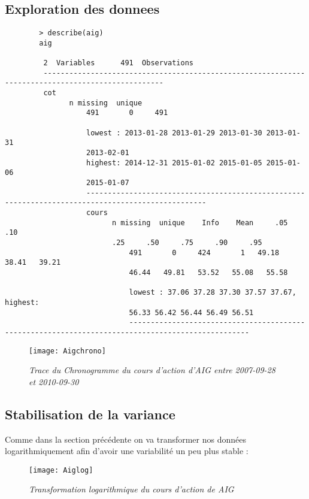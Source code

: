     \subsection{Exploration des donnees}
        \begin{verbatim}    
        > describe(aig)
        aig 

         2  Variables      491  Observations
         --------------------------------------------------------------------------------------------------
         cot 
               n missing  unique 
                   491       0     491 

                   lowest : 2013-01-28 2013-01-29 2013-01-30 2013-01-31
                   2013-02-01
                   highest: 2014-12-31 2015-01-02 2015-01-05 2015-01-06
                   2015-01-07 
                   --------------------------------------------------------------------------------------------------
                   cours 
                         n missing  unique    Info    Mean     .05     .10
                         .25     .50     .75     .90     .95 
                             491       0     424       1   49.18   38.41   39.21
                             46.44   49.81   53.52   55.08   55.58 

                             lowest : 37.06 37.28 37.30 37.57 37.67, highest:
                             56.33 56.42 56.44 56.49 56.51 
                             --------------------------------------------------------------------------------------------------
        \end{verbatim}
        \begin{figure}[H]
            \centering 
           \label{fig:Aigchrono} 
            \texttt{[image: Aigchrono]} 
            \caption{\it Trace du Chronogramme du cours d'action d'AIG entre
            2007-09-28 et 2010-09-30} 
        \end{figure} 

    \subsection{Stabilisation de la variance}                

        Comme dans la section précédente on va transformer nos données
        logarithmiquement afin d'avoir une variabilité un peu plus
        stable :
        \begin{figure}[H]
            \centering 
            \label{fig:Aiglog} 
            \texttt{[image: Aiglog]} 
            \caption{\it Transformation logarithmique du cours
            d'action de AIG } 
        \end{figure} 

